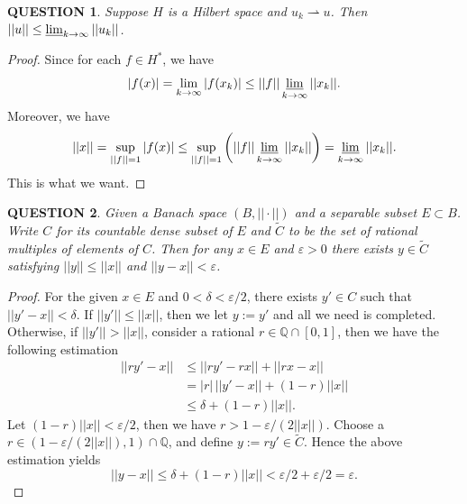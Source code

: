 \documentclass[12pt]{article}
\renewcommand{\(}{\left(}%
\renewcommand{\)}{\right)}%
\renewcommand{\[}{\left[}%
\renewcommand{\]}{\right]}%
\newcommand{\q}{\mathbb{Q}}
\newtheorem{question}{QUESTION}[section]}
\newtheorem{proof}{Proof.}}
\begin{document}
  \begin{question}
   Suppose $H$ is a Hilbert space and $u_k\rightharpoonup u$. Then $||u||\leq \varliminf_{k\to\infty}||u_k||$.
  \end{question}
  \begin{proof}
   Since for each $f\in H^*$, we have
   \begin{equation*}
    |f(x)|=\lim_{k\to\infty}|f(x_k)|\leq ||f||\varliminf_{k\to\infty}||x_k||.
   \end{equation*}
   Moreover, we have
   \begin{equation*}
    ||x||=\sup_{||f||=1}|f(x)|\leq \sup_{||f||=1}\(||f||\varliminf_{k\to\infty}||x_k||\)=\varliminf_{k\to\infty}||x_k||.
   \end{equation*}
   This is what we want.
  \end{proof}

  \begin{question}
  	Given a Banach space $(B,||\cdot||)$ and a separable subset $E\subset B$. Write $C$ for its countable dense subset of $E$ and $\widetilde{C}$ to be the set of rational multiples of elements of $C$. Then for any $x\in E$ and $\varepsilon>0$ there exists $y\in\widetilde{C}$ satisfying $||y||\leq ||x||$ and $||y-x||<\varepsilon$.
  \end{question}
  \begin{proof}
  	For the given $x\in E$ and $0<\delta<\varepsilon/2$, there exists $y'\in C$ such that $||y'-x||<\delta$. If $||y'||\leq ||x||$, then we let $y:=y'$ and all we need is completed. Otherwise, if $||y'||>||x||$, consider a rational $r\in\q\cap[0,1]$, then we have the following estimation
  	\begin{equation*}
  		\begin{split}
  			||ry'-x||&\leq ||ry'-rx||+||rx-x||\\
  			&=|r|\,||y'-x||+(1-r)||x||\\
  			&\leq \delta +(1-r)||x||.
  		\end{split}
  	\end{equation*}
  	Let $(1-r)||x||<\varepsilon/2$, then we have $r>1-\varepsilon/(2||x||)$. Choose a $r\in(1-\varepsilon/(2||x||),1)\cap\q$, and define $y:=ry'\in \widetilde{C}$. Hence the above estimation yields
  	\begin{equation*}
  		||y-x||\leq \delta +(1-r)||x||<\varepsilon/2+\varepsilon/2=\varepsilon.
  	\end{equation*}
  \end{proof}
  
\end{document}
